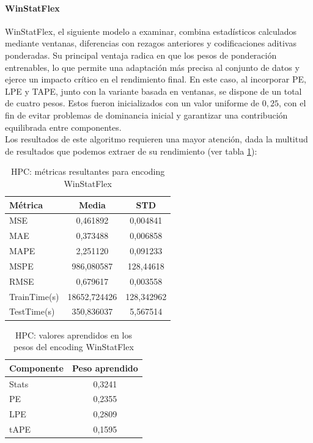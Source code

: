 \paragraph{WinStatFlex}

WinStatFlex, el siguiente modelo a examinar, combina estadísticos calculados mediante ventanas, diferencias con rezagos anteriores y codificaciones aditivas ponderadas. Su principal ventaja radica en que los pesos de ponderación entrenables, lo que permite una adaptación más precisa al conjunto de datos y ejerce un impacto crítico en el rendimiento final. En este caso, al incorporar PE, LPE y TAPE, junto con la variante basada en ventanas, se dispone de un total de cuatro pesos. Estos fueron inicializados con un valor uniforme de $0,25$, con el fin de evitar problemas de dominancia inicial y garantizar una contribución equilibrada entre componentes.\\

Los resultados de este algoritmo requieren una mayor atención, dada la multitud de resultados que podemos extraer de su rendimiento (ver tabla \ref{hpcflex}):

\begin{table}[!ht]
	\centering
	\begin{tabular}{l|c|c}
		\toprule
		Métrica & Media & STD \\
		\midrule
		MSE & 0,461892 & 0,004841 \\
		MAE & 0,373488 & 0,006858 \\
		MAPE & 2,251120 & 0,091233 \\
		MSPE & 986,080587 & 128,44618 \\
		RMSE & 0,679617 & 0,003558 \\
		TrainTime(s) & 18652,724426 & 128,342962 \\
		TestTime(s) & 350,836037 & 5,567514 \\
		\bottomrule
	\end{tabular}
	\caption{HPC: métricas resultantes para encoding WinStatFlex}
	\label{hpcflex}
\end{table}

\begin{table}[!ht]
	\centering
	\begin{tabular}{l|c}
		\toprule
		Componente & Peso aprendido \\
		\midrule
		Stats & 0,3241 \\
		PE & 0,2355 \\
		LPE & 0,2809 \\
		tAPE & 0,1595 \\
		\bottomrule
	\end{tabular}
	\caption{HPC: valores aprendidos en los pesos del encoding WinStatFlex}
	\label{hpcflexpesos}
\end{table}

